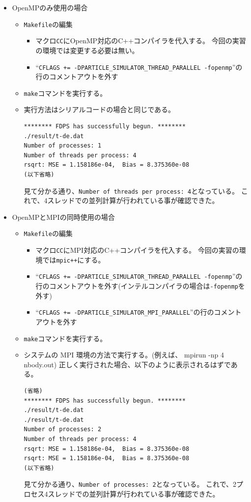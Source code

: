 \documentclass[12pt,a4paper,dvipdfmx]{jarticle}
\begin{document}
\begin{itemize}
\item OpenMPのみ使用の場合
  \begin{itemize}
  \item \texttt{Makefile}の編集
    \begin{itemize}
    \item マクロ\texttt{CC}にOpenMP対応のC++コンパイラを代入する。
          今回の実習の環境では変更する必要は無い。
    \item ``\texttt{CFLAGS += -DPARTICLE\_SIMULATOR\_THREAD\_PARALLEL -fopenmp}''の
      行のコメントアウトを外す
    \end{itemize}
  \item \texttt{make}コマンドを実行する。
  \item 実行方法はシリアルコードの場合と同じである。

\begin{screen}
\begin{verbatim}
******** FDPS has successfully begun. ********
./result/t-de.dat
Number of processes: 1
Number of threads per process: 4
rsqrt: MSE = 1.158186e-04,  Bias = 8.375360e-08
(以下省略)
\end{verbatim}
\end{screen}
       見て分かる通り、\texttt{Number of threads per process: 4}となっている。
       これで、4スレッドでの並列計算が行われている事が確認できた。
  \end{itemize}

\item OpenMPとMPIの同時使用の場合
  \begin{itemize}
  \item \texttt{Makefile}の編集
    \begin{itemize}
    \item マクロ\texttt{CC}にMPI対応のC++コンパイラを代入する。
          今回の実習の環境では\texttt{mpic++}にする。
    \item ``\texttt{CFLAGS += -DPARTICLE\_SIMULATOR\_THREAD\_PARALLEL -fopenmp}''の
      行のコメントアウトを外す(インテルコンパイラの場合は\texttt{-fopenmp}を外す)
    \item ``\texttt{CFLAGS += -DPARTICLE\_SIMULATOR\_MPI\_PARALLEL}''の行のコメント
      アウトを外す
    \end{itemize}
  \item \texttt{make}コマンドを実行する。
  \item システムの MPI 環境の方法で実行する。(例えば、 mpirun -np 4
    nbody.out) 正しく実行された場合、以下のように表示されるはずである。
\begin{screen}
\begin{verbatim}
(省略)
******** FDPS has successfully begun. ********
./result/t-de.dat
./result/t-de.dat
Number of processes: 2
Number of threads per process: 4
rsqrt: MSE = 1.158186e-04,  Bias = 8.375360e-08
rsqrt: MSE = 1.158186e-04,  Bias = 8.375360e-08
(以下省略)
\end{verbatim}
\end{screen}
       見て分かる通り、\texttt{Number of processes: 2}となっている。
       これで、2プロセス4スレッドでの並列計算が行われている事が確認できた。
  \end{itemize}


\end{itemize}
\end{document}
